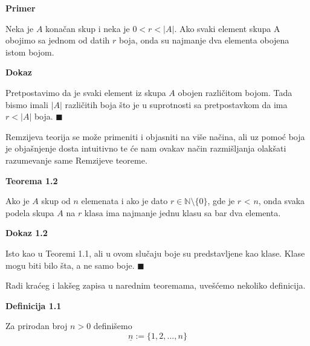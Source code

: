 \documentclass[12pt,a4paper]{article}
\begin{document}
	\vspace{1.5em}
	{\noindent\fontsize{12pt}{12pt}\textbf{Primer}}
	\vspace{0.5em}

	\noindent Neka je $A$ konačan skup i neka je $0 < r < |A|$.
	Ako svaki element skupa A obojimo sa jednom od datih $r$ boja, onda su najmanje dva
	elementa obojena istom bojom.
	\vspace{0.5em}

	{\noindent\fontsize{12pt}{12pt}\textbf{Dokaz}}
	\vspace{0.5em}	

	\noindent Pretpostavimo da je svaki element iz skupa $A$ obojen različitom bojom. Tada bismo
	imali $|A|$ različitih boja što je u suprotnosti sa pretpostavkom da ima $r < |A|$ boja. $\blacksquare$\\

	\vspace{0.8em}

	\noindent Remzijeva teorija se može primeniti i objasniti na više načina, ali uz pomoć boja 
	je objašnjenje dosta intuitivno te će nam ovakav način razmišljanja olakšati razumevanje same Remzijeve teoreme.

	\vspace{0.8em}
	{\noindent\fontsize{12pt}{12pt}\textbf{Teorema 1.2}}
	\vspace{0.5em}

	\noindent Ako je $A$ skup od $n$ elemenata i ako je dato $r \in \mathbb{N}\setminus \lbrace 0 \rbrace$, gde je $r$ < $n$, onda svaka podela skupa $A$ na $r$ klasa ima najmanje jednu klasu sa bar dva elementa.
	\vspace{1.5em}

	{\noindent\fontsize{12pt}{12pt}\textbf{Dokaz 1.2}}
	\vspace{0.5em}

	\noindent Isto kao u Teoremi 1.1, ali u ovom slučaju boje su predstavljene kao klase.
	Klase mogu biti bilo šta, a ne samo boje. $\blacksquare$

	\vspace{0.7em}
	
	\noindent Radi kraćeg i lakšeg zapisa u narednim teoremama, uvešćemo nekoliko definicija.
	
	\vspace{0.7em}	
	
	\begin{mdframed}
	
	{\noindent\fontsize{12pt}{12pt}\textbf{Definicija 1.1}}
	\vspace{0.5em}

	\noindent Za prirodan broj $n > 0$ definišemo\\
	\[\underline{n} := \lbrace1, 2, . . . , n \rbrace\]	
	
	\end{mdframed}	
	
\end{document}
